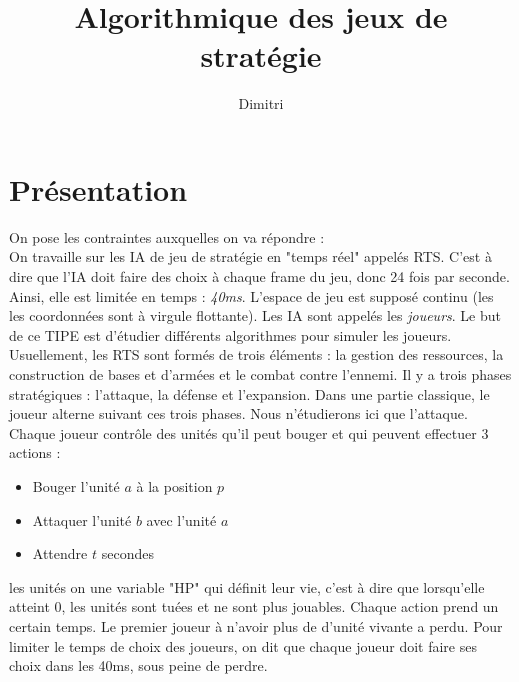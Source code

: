 \documentclass[a4paper, 11pt]{article}
\theoremstyle{definition}
\begin{document}
\title{Algorithmique des jeux de stratégie}
\author{Dimitri }

\section*{Présentation}
On pose les contraintes auxquelles on va répondre :\\
On travaille sur les IA de jeu de stratégie en "temps réel" appelés RTS. C'est à dire que
l'IA doit faire des choix à chaque frame du jeu, donc 24 fois par seconde. Ainsi,
elle est limitée en temps : \emph{40ms}. L'espace de jeu est supposé continu (les
les coordonnées sont à virgule flottante). Les IA sont appelés les \emph{joueurs}.
Le but de ce TIPE est d'étudier différents algorithmes pour simuler les joueurs.
Usuellement, les RTS sont formés de trois éléments : la gestion des ressources,
la construction de bases et d'armées et le combat contre l'ennemi. Il y a trois 
phases stratégiques : l'attaque, la défense et l'expansion. Dans une partie classique,
le joueur alterne suivant ces trois phases. Nous n'étudierons ici que l'attaque.
\\
Chaque joueur contrôle des unités qu'il peut bouger et qui peuvent effectuer 3
actions :
\begin{itemize}
    \item Bouger l'unité $a$ à la position $p$
    \item Attaquer l'unité $b$ avec l'unité $a$
    \item Attendre $t$ secondes
\end{itemize}
les unités on une variable "HP" qui définit leur vie, c'est à dire que lorsqu'elle
atteint 0, les unités sont tuées et ne sont plus jouables. Chaque action prend
un certain temps.
Le premier joueur à n'avoir plus de d'unité vivante a perdu.
Pour limiter le temps de choix des joueurs, on dit que chaque joueur doit faire ses
choix dans les 40ms, sous peine de perdre.
\end{document}
